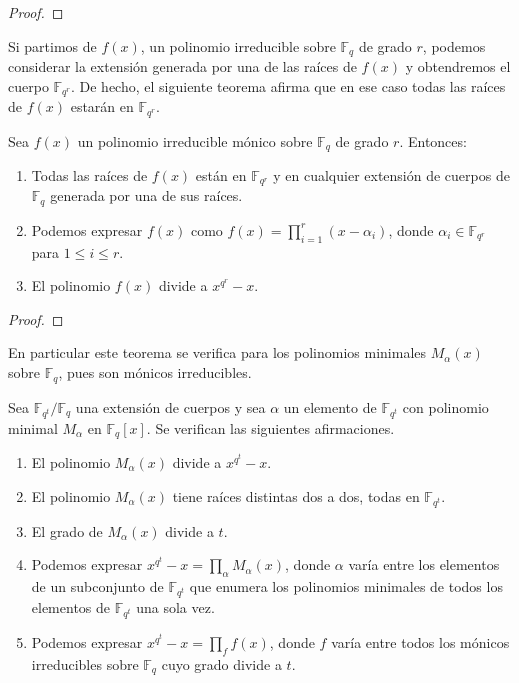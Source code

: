 \begin{proof}
\end{proof}

Si partimos de \(f(x)\), un polinomio irreducible sobre \(\mathbb F_q\) de grado \(r\), podemos considerar la extensión generada por una de las raíces de \(f(x)\) y obtendremos el cuerpo \(\mathbb F_{q^r}\).
De hecho, el siguiente teorema afirma que en ese caso todas las raíces de \(f(x)\) estarán en \(\mathbb F_{q^r}\).

\begin{theorem}
  Sea \(f(x)\) un polinomio irreducible mónico sobre \(\mathbb F_q\) de grado \(r\).
  Entonces:
  \begin{enumerate}
    \item Todas las raíces de \(f(x)\) están en \(\mathbb F_{q^r}\) y en cualquier extensión de cuerpos de \(\mathbb F_q\) generada por una de sus raíces.
    \item Podemos expresar \(f(x)\) como \(f(x) = \prod_{i=1}^r (x - \alpha_i)\), donde \(\alpha_i \in \mathbb F_{q^r}\) para \(1 \leq i \leq r\).
    \item El polinomio \(f(x)\) divide a \(x^{q^r} - x\).
  \end{enumerate}
\end{theorem}

\begin{proof}
\end{proof}

En particular este teorema se verifica para los polinomios minimales \(M_{\alpha}(x)\) sobre \(\mathbb F_q\), pues son mónicos irreducibles.

\begin{theorem}
  \label{th:prop-pol-minimal}
  Sea \(\mathbb F_{q^t}/\mathbb F_q\) una extensión de cuerpos y sea \(\alpha\) un elemento de \(\mathbb F_{q^t}\) con polinomio minimal \(M_{\alpha}\) en \(\mathbb F_q[x]\).
  Se verifican las siguientes afirmaciones.
  \begin{enumerate}
    \item El polinomio \(M_{\alpha}(x)\) divide a \(x^{q^t} - x\).
    \item El polinomio \(M_{\alpha}(x)\) tiene raíces distintas dos a dos, todas en \(\mathbb F_{q^t}\).
    \item El grado de \(M_{\alpha}(x)\) divide a \(t\).
    \item Podemos expresar \(x^{q^t}- x = \prod_{\alpha}M_{\alpha}(x)\), donde \(\alpha\) varía entre los elementos de un subconjunto de \(\mathbb F_{q^t}\) que enumera los polinomios minimales de todos los elementos de \(\mathbb F_{q^t}\) una sola vez.
    \item Podemos expresar \(x^{q^t}- x = \prod_{f}f(x)\), donde \(f\) varía entre todos los mónicos irreducibles sobre \(\mathbb F_q\) cuyo grado divide a \(t\).
  \end{enumerate}
\end{theorem}

